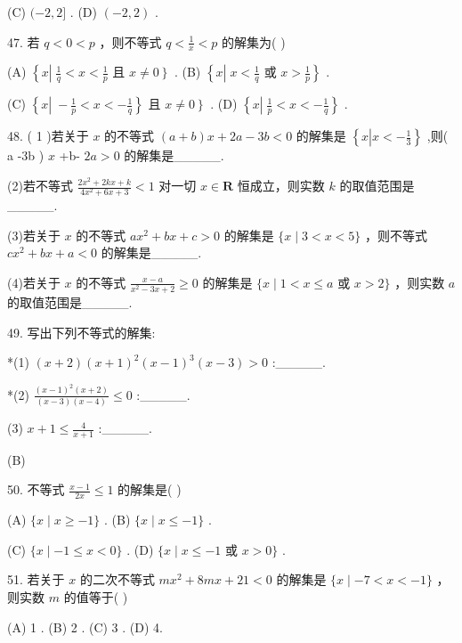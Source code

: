 \documentclass[10pt]{article}
\begin{document}
(C) \(( - 2,2\rbrack\) . (D) \(\left( {-2,2}\right)\) .

47. 若 \(q < 0 < p\) ，则不等式 \(q < \frac{1}{x} < p\) 的解集为( )

(A) \(\left\{  {x\left| {\;\frac{1}{q} < x < \frac{1}{p}}\right. }\right.\) 且 \(\left. {x \neq  0}\right\}\) . (B) \(\left\{  {x\left| {\;x < \frac{1}{q}}\right. }\right.\) 或 \(\left. {x > \frac{1}{p}}\right\}\) .

(C) \(\left\{  {x\left| {\; - \frac{1}{p} < x <  - \frac{1}{q}}\right. }\right\}\) 且 \(\left. {x \neq  0}\right\}\) . (D) \(\left\{  {x\left| {\;\frac{1}{p} < x <  - \frac{1}{q}}\right. }\right\}\) .

48. ( 1 )若关于 \(x\) 的不等式 \(\left( {a + b}\right) x + {2a} - {3b} < 0\) 的解集是 \(\left\{  {x\left| {x <  - \frac{1}{3}}\right. }\right\}\) ,则( a -3b ) \(x\) +b- \({2a} > 0\) 的解集是\_\_\_\_\_.

(2)若不等式 \(\frac{2{x}^{2} + {2kx} + k}{4{x}^{2} + {6x} + 3} < 1\) 对一切 \(x \in  \mathbf{R}\) 恒成立，则实数 \(k\) 的取值范围是\_\_\_\_\_.

(3)若关于 \(x\) 的不等式 \(a{x}^{2} + {bx} + c > 0\) 的解集是 \(\{ x \mid  3 < x < 5\}\) ，则不等式 \(c{x}^{2} + {bx} + a < 0\) 的解集是\_\_\_\_\_.

(4)若关于 \(x\) 的不等式 \(\frac{x - a}{{x}^{2} - {3x} + 2} \geq  0\) 的解集是 \(\{ x \mid  1 < x \leq  a\) 或 \(x > 2\}\) ，则实数 \(a\) 的取值范围是\_\_\_\_\_.

49. 写出下列不等式的解集:

*(1) \(\left( {x + 2}\right) {\left( x + 1\right) }^{2}{\left( x - 1\right) }^{3}\left( {x - 3}\right)  > 0\) :\_\_\_\_\_.

*(2) \(\frac{{\left( x - 1\right) }^{2}\left( {x + 2}\right) }{\left( {x - 3}\right) \left( {x - 4}\right) } \leq  0\) :\_\_\_\_\_.

(3) \(x + 1 \leq  \frac{4}{x + 1}\) :\_\_\_\_\_.

(B)

50. 不等式 \(\frac{x - 1}{2x} \leq  1\) 的解集是( )

(A) \(\{ x \mid  x \geq   - 1\}\) . (B) \(\{ x \mid  x \leq   - 1\}\) .

(C) \(\{ x \mid   - 1 \leq  x < 0\}\) . (D) \(\{ x \mid  x \leq   - 1\) 或 \(x > 0\}\) .

51. 若关于 \(x\) 的二次不等式 \(m{x}^{2} + {8mx} + {21} < 0\) 的解集是 \(\{ x \mid   - 7 < x <  - 1\}\) ，则实数 \(m\) 的值等于( )

(A) 1 . (B) 2 . (C) 3 . (D) 4.
\end{document}
